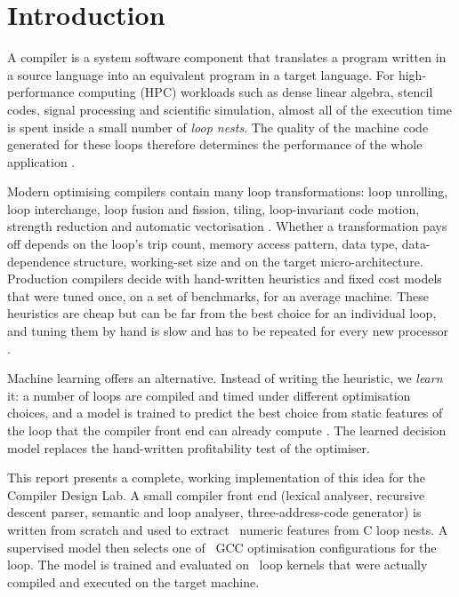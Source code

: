 \documentclass[12pt,a4paper]{article}
\begin{document}


\newpage

\section{Introduction}

A compiler is a system software component that translates a program written in
a source language into an equivalent program in a target language. For
high-performance computing (HPC) workloads such as dense linear algebra,
stencil codes, signal processing and scientific simulation, almost all of the
execution time is spent inside a small number of \emph{loop nests}. The quality
of the machine code generated for these loops therefore determines the
performance of the whole application \cite{allen2002,bacon1994}.

Modern optimising compilers contain many loop transformations: loop unrolling,
loop interchange, loop fusion and fission, tiling, loop-invariant code motion,
strength reduction and automatic vectorisation \cite{aho2006,cooper2007,muchnick1997}.
Whether a transformation pays off depends on the loop's trip count, memory
access pattern, data type, data-dependence structure, working-set size and on
the target micro-architecture. Production compilers decide with hand-written
heuristics and fixed cost models that were tuned once, on a set of benchmarks, for
an average machine. These heuristics are cheap but can be far from the best choice
for an individual loop, and tuning them by hand is slow and has to be repeated
for every new processor \cite{wang2018,ashouri2018}.

Machine learning offers an alternative. Instead of writing the heuristic, we
\emph{learn} it: a number of loops are compiled and timed under different
optimisation choices, and a model is trained to predict the best choice from
static features of the loop that the compiler front end can already compute
\cite{stephenson2003,stephenson2005,fursin2011}. The learned decision model
replaces the hand-written profitability test of the optimiser.

This report presents a complete, working implementation of this idea for the
Compiler Design Lab. A small compiler front end (lexical analyser, recursive
descent parser, semantic and loop analyser, three-address-code generator) is
written from scratch and used to extract \numFeatures\ numeric features from C
loop nests. A supervised model then selects one of \numConfigs\ GCC optimisation
configurations for the loop. The model is trained and evaluated on
\numKernels\ loop kernels that were actually compiled and executed on the
target machine.
\end{document}
